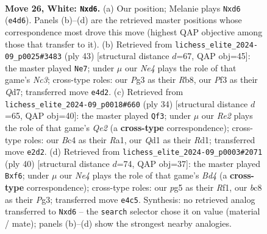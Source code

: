\documentclass[11pt]{article}
\begin{document}
\begin{figure}[p]
\label{fig:thought-m48}
\end{figure}

\clearpage

\begin{figure}[p]\centering
\begin{subfigure}{0.46\textwidth}\centering
\resizebox{\linewidth}{!}{%
\newchessgame
\chessboard[
  setfen={rnb5/pp2q1k1/2pr2p1/6pp/2BPN3/P4PP1/1P2R2P/2RQ2K1 w - - 1 26},
  showmover=false,
  pgfstyle=straightmove, color=movearrow, markmove={e4-d6}
]}
\caption{}
\end{subfigure}\hfill
\begin{subfigure}{0.46\textwidth}\centering
\resizebox{\linewidth}{!}{%
\newchessgame
\chessboard[
  setfen={1rr3k1/3q2pp/1pn1bp2/p3p3/N7/P1RPPBP1/1Q3P1P/R5K1 b - - 0 22},
  showmover=false,
  pgfstyle=straightmove, color=movearrow, markmove={c6-e7}
]}
\caption{}
\end{subfigure}
\\[4pt]
\begin{subfigure}{0.46\textwidth}\centering
\resizebox{\linewidth}{!}{%
\newchessgame
\chessboard[
  setfen={r3r1k1/ppq3pp/2pb4/3nNpp1/2BP4/2P4P/PP2QP2/R2R2K1 w - - 0 18},
  showmover=false,
  pgfstyle=straightmove, color=movearrow, markmove={e2-f3}
]}
\caption{}
\end{subfigure}\hfill
\begin{subfigure}{0.46\textwidth}\centering
\resizebox{\linewidth}{!}{%
\newchessgame
\chessboard[
  setfen={5rk1/1r3ppp/p3pn2/1qb5/1pNB1P2/1P4P1/P2P3P/2RQ1R1K w - - 0 21},
  showmover=false,
  pgfstyle=straightmove, color=movearrow, markmove={d4-f6}
]}
\caption{}
\end{subfigure}
\caption{\textbf{Move 26, White: \texttt{Nxd6}.} (a) Our position; Melanie plays \texttt{Nxd6} (\texttt{e4d6}). Panels (b)--(d) are the retrieved master positions whose correspondence most drove this move (highest QAP objective among those that transfer to it). (b) Retrieved from \texttt{lichess\_elite\_2024-09\_p0025\#3483} (ply 43) [structural distance $d$=67, QAP obj=45]: the master played \texttt{Ne7}; under $\mu$ our \emph{Ne4} plays the role of that game's \emph{Nc3}; cross-type roles: our \emph{P}g3 as their \emph{R}b8, our \emph{P}f3 as their \emph{Q}d7; transferred move \texttt{e4d2}. (c) Retrieved from \texttt{lichess\_elite\_2024-09\_p0018\#660} (ply 34) [structural distance $d$=65, QAP obj=40]: the master played \texttt{Qf3}; under $\mu$ our \emph{Re2} plays the role of that game's \emph{Qe2} (a \textbf{cross-type} correspondence); cross-type roles: our \emph{B}c4 as their \emph{R}a1, our \emph{Q}d1 as their \emph{R}d1; transferred move \texttt{e2d2}. (d) Retrieved from \texttt{lichess\_elite\_2024-09\_p0003\#2071} (ply 40) [structural distance $d$=74, QAP obj=37]: the master played \texttt{Bxf6}; under $\mu$ our \emph{Ne4} plays the role of that game's \emph{Bd4} (a \textbf{cross-type} correspondence); cross-type roles: our \emph{p}g5 as their \emph{R}f1, our \emph{b}c8 as their \emph{P}g3; transferred move \texttt{e4c5}. Synthesis: no retrieved analog transferred to \texttt{Nxd6} -- the \texttt{search} selector chose it on value (material / mate); panels (b)--(d) show the strongest nearby analogies.}

\end{figure}
\end{document}
